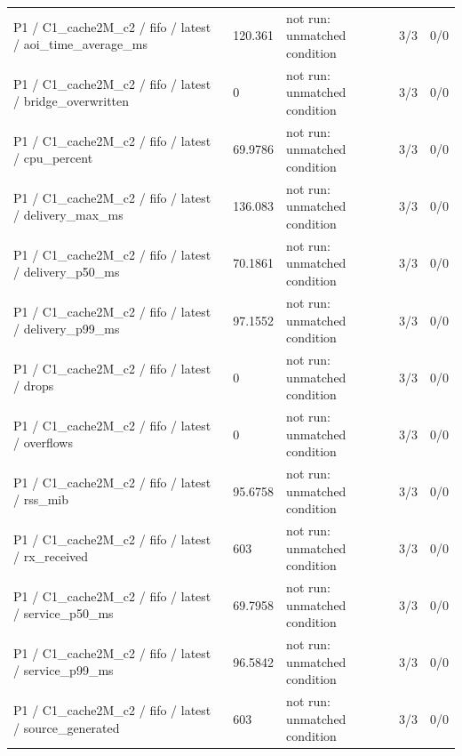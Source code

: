 \begin{tabular}{@{}lllll@{}}
P1 / C1\_cache2M\_c2 / fifo / latest / aoi\_time\_average\_ms & 120.361 & not run: unmatched condition & 3/3 & 0/0 \\
P1 / C1\_cache2M\_c2 / fifo / latest / bridge\_overwritten & 0 & not run: unmatched condition & 3/3 & 0/0 \\
P1 / C1\_cache2M\_c2 / fifo / latest / cpu\_percent & 69.9786 & not run: unmatched condition & 3/3 & 0/0 \\
P1 / C1\_cache2M\_c2 / fifo / latest / delivery\_max\_ms & 136.083 & not run: unmatched condition & 3/3 & 0/0 \\
P1 / C1\_cache2M\_c2 / fifo / latest / delivery\_p50\_ms & 70.1861 & not run: unmatched condition & 3/3 & 0/0 \\
P1 / C1\_cache2M\_c2 / fifo / latest / delivery\_p99\_ms & 97.1552 & not run: unmatched condition & 3/3 & 0/0 \\
P1 / C1\_cache2M\_c2 / fifo / latest / drops & 0 & not run: unmatched condition & 3/3 & 0/0 \\
P1 / C1\_cache2M\_c2 / fifo / latest / overflows & 0 & not run: unmatched condition & 3/3 & 0/0 \\
P1 / C1\_cache2M\_c2 / fifo / latest / rss\_mib & 95.6758 & not run: unmatched condition & 3/3 & 0/0 \\
P1 / C1\_cache2M\_c2 / fifo / latest / rx\_received & 603 & not run: unmatched condition & 3/3 & 0/0 \\
P1 / C1\_cache2M\_c2 / fifo / latest / service\_p50\_ms & 69.7958 & not run: unmatched condition & 3/3 & 0/0 \\
P1 / C1\_cache2M\_c2 / fifo / latest / service\_p99\_ms & 96.5842 & not run: unmatched condition & 3/3 & 0/0 \\
P1 / C1\_cache2M\_c2 / fifo / latest / source\_generated & 603 & not run: unmatched condition & 3/3 & 0/0 \\
\bottomrule
\end{tabular}

